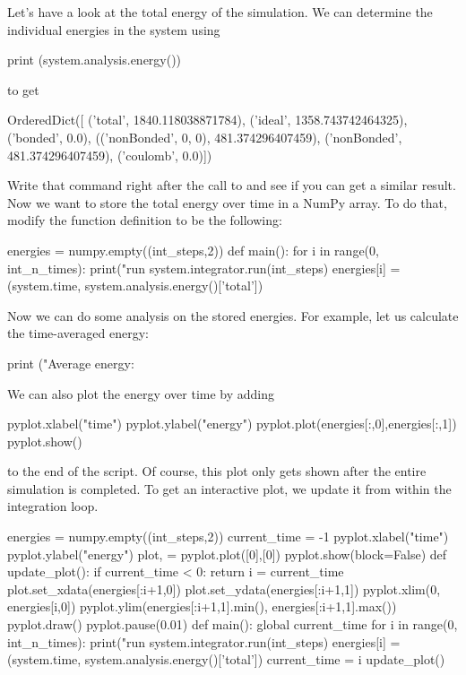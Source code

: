 \documentclass[
paper=a4,                       %
fontsize=11pt,                  %
twoside,                        %
footsepline,                    %
headsepline,                    %
headinclude=false,              %
footinclude=false,              %
pagesize,                       %
]{scrartcl}
\begin{document}
Let's have a look at the total energy of the simulation.
We can determine the individual energies in the system using
\begin{pypresso}
print (system.analysis.energy())
\end{pypresso}
to get
\begin{pypresso}
OrderedDict([
        ('total', 1840.118038871784),
        ('ideal', 1358.743742464325),
        ('bonded', 0.0), 
        (('nonBonded', 0, 0), 481.374296407459), 
        ('nonBonded', 481.374296407459), 
        ('coulomb', 0.0)])
\end{pypresso}
Write that command right after the call to  and see if you can get a similar result.
Now we want to store the total energy over time in a NumPy array.
To do that, modify the  function definition to be the following:
\begin{pypresso}
energies = numpy.empty((int_steps,2))
def main():
    for i in range(0, int_n_times):
        print("run %
        system.integrator.run(int_steps)
        energies[i] = (system.time, system.analysis.energy()['total'])
\end{pypresso}
Now we can do some analysis on the stored energies.
For example, let us calculate the time-averaged energy:
\begin{pypresso}
print ("Average energy: %
\end{pypresso}
We can also plot the energy over time by adding
\begin{pypresso}
pyplot.xlabel("time")
pyplot.ylabel("energy")
pyplot.plot(energies[:,0],energies[:,1])
pyplot.show()
\end{pypresso}
to the end of the script. Of course, this plot only gets shown after the entire simulation is completed.
To get an interactive plot, we update it from within the integration loop.
\begin{pypresso}
energies = numpy.empty((int_steps,2))
current_time = -1
pyplot.xlabel("time")
pyplot.ylabel("energy")
plot, = pyplot.plot([0],[0])
pyplot.show(block=False)
def update_plot():
    if current_time < 0:
        return
    i = current_time
    plot.set_xdata(energies[:i+1,0])
    plot.set_ydata(energies[:i+1,1])
    pyplot.xlim(0, energies[i,0])
    pyplot.ylim(energies[:i+1,1].min(), energies[:i+1,1].max())
    pyplot.draw()
    pyplot.pause(0.01)
def main():
    global current_time
    for i in range(0, int_n_times):
        print("run %
        system.integrator.run(int_steps)
        energies[i] = (system.time, system.analysis.energy()['total'])
        current_time = i
        update_plot()
\end{pypresso}
\end{document}
